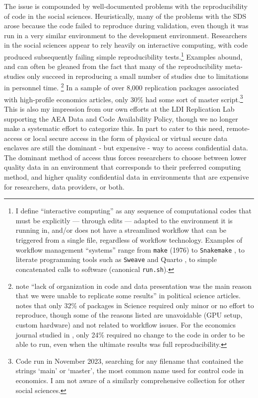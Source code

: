 \documentclass[inline]{hdsr}
\begin{document}
The issue is compounded by well-documented problems with the reproducibility of code in the social sciences. Heuristically, many of the problems with the SDS arose because the code failed to reproduce during validation, even though it was  run in a very similar environment to the development environment. Researchers in the social sciences appear to rely heavily on interactive computing, with code produced subsequently failing simple reproducibility tests.\footnote{I define ``interactive computing'' as any sequence of computational codes that must be explicitly --- through edits --- adapted to the environment it is running in, and/or does not have a streamlined workflow that can be triggered from a single file, regardless of workflow technology. Examples of workflow management ``systems'' range from \texttt{make} (1976) \citep{association_for_computing_machinery_acm_2003} to \texttt{Snakemake} \citep{molder_sustainable_2021}, to literate programming tools such as \texttt{Sweave} \citep{Leisch2002SweaveDG} and Quarto \citep{Allaire_Quarto_2024}, to simple concatenated calls to software (canonical \texttt{run.sh}). } Examples abound, and can often be gleaned from the fact that many of the reproducibility meta-studies only succeed in reproducing a small number of studies due to limitations in personnel time.%
\footnote{\citet{stockemer_data_2018} note ``lack of organization in code and data presentation was the main reason that we were unable to replicate some results'' in political science articles. \citet{StoddenPNAS2018} notes that only 32\% of packages in Science required only minor or no effort to reproduce, though some of the reasons listed are unavoidable (GPU setup, custom hardware) and not related to workflow issues. For the economics journal studied in \citet{herbert_reproduce_2024}, only 24\% required no change to the code in order to be able to run, even when the ultimate results was full reproducibility.}
%
In a sample of over 8,000 replication packages associated with high-profile economics articles, only 30\% had some sort of master script.\footnote{Code run in November 2023, searching for any filename that contained the strings `main' or `master', the most common name used for control code in economics. I am not aware of a similarly comprehensive collection for other social sciences.} This is also my impression from our own efforts at the LDI Replication Lab supporting the AEA Data and Code Availability Policy, though we no longer make a systematic effort to categorize this.  In part to cater to this need, remote-access or local secure access in the form of physical or virtual secure data enclaves are still the dominant - but expensive - way to access confidential data. The dominant method of access thus forces researchers to choose between lower quality data in an environment that corresponds to their preferred computing method, and higher quality confidential data in environments that are expensive for researchers, data providers, or both.
\end{document}
